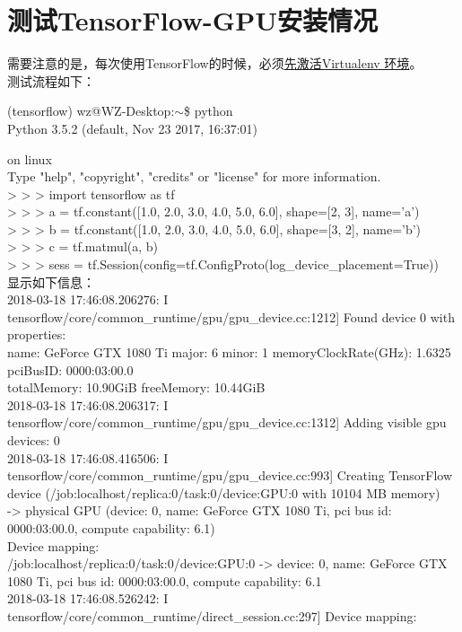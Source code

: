 \documentclass[11pt,a4paper]{ctexart}
\begin{document}
\section{测试TensorFlow-GPU安装情况}

需要注意的是，每次使用TensorFlow的时候，必须\hyperref[activate]{先激活Virtualenv 环境}。\\
测试流程如下：

\noindent (tensorflow) wz@WZ-Desktop:$\sim$\$ python\\
Python 3.5.2 (default, Nov 23 2017, 16:37:01) 

\noindent [GCC 5.4.0 20160609] on linux\\
Type "help", "copyright", "credits" or "license" for more information.\\
> > > import tensorflow as tf\\
> > > a = tf.constant([1.0, 2.0, 3.0, 4.0, 5.0, 6.0], shape=[2, 3], name='a')\\
> > > b = tf.constant([1.0, 2.0, 3.0, 4.0, 5.0, 6.0], shape=[3, 2], name='b')\\
> > > c = tf.matmul(a, b)\\
> > > sess = tf.Session(config=tf.ConfigProto(log\_device\_placement=True))\\
显示如下信息：\\
2018-03-18 17:46:08.206276: I tensorflow/core/common\_runtime/gpu/gpu\_device.cc:1212] Found device 0 with properties: \\
name: GeForce GTX 1080 Ti major: 6 minor: 1 memoryClockRate(GHz): 1.6325\\
pciBusID: 0000:03:00.0\\
totalMemory: 10.90GiB freeMemory: 10.44GiB\\
2018-03-18 17:46:08.206317: I tensorflow/core/common\_runtime/gpu/gpu\_device.cc:1312] Adding visible gpu devices: 0\\
2018-03-18 17:46:08.416506: I tensorflow/core/common\_runtime/gpu/gpu\_device.cc:993] Creating TensorFlow device (/job:localhost/replica:0/task:0/device:GPU:0 with 10104 MB memory)\\ -> physical GPU (device: 0, name: GeForce GTX 1080 Ti, pci bus id: 0000:03:00.0, compute capability: 6.1)\\
Device mapping:\\
/job:localhost/replica:0/task:0/device:GPU:0 -> device: 0, name: GeForce GTX 1080 Ti, pci bus id: 0000:03:00.0, compute capability: 6.1\\
2018-03-18 17:46:08.526242: I tensorflow/core/common\_runtime/direct\_session.cc:297] Device mapping:\\
\end{document}
